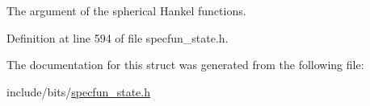 The argument of the spherical Hankel functions. 



Definition at line 594 of file specfun\+\_\+state.\+h.



The documentation for this struct was generated from the following file\+:\begin{DoxyCompactItemize}
\item 
include/bits/\hyperlink{specfun__state_8h}{specfun\+\_\+state.\+h}\end{DoxyCompactItemize}
